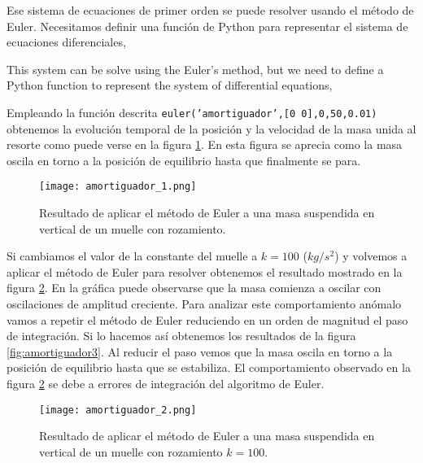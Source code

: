 \begin{paracol}{2}
Ese sistema de ecuaciones de primer orden se puede resolver usando el método de Euler. Necesitamos definir una función de Python para representar el sistema de ecuaciones diferenciales,

\switchcolumn
This system can be solve using the Euler's method, but we need to define a Python function to represent the system of differential equations,
\end{paracol}


\begin{paracol}{2}
Empleando la función descrita \texttt{euler('amortiguador',[0 0],0,50,0.01)} obtenemos la evolución temporal de la posición y la velocidad de la masa unida al resorte como puede verse en la figura \ref{fig:amortiguador1}. En esta figura se aprecia como la masa oscila en torno a la posición de equilibrio hasta que finalmente se para.
\end{paracol}
\begin{figure}[h]
	\centering
	\texttt{[image: amortiguador\_1.png]}
	\caption{Resultado de aplicar el método de Euler a una masa suspendida en vertical de un muelle con rozamiento.}
	\label{fig:amortiguador1}
\end{figure}
\begin{paracol}{2}
Si cambiamos el valor de la constante del muelle a $k=100$ ($kg/s^2$) y volvemos a aplicar el método de Euler para resolver obtenemos el resultado mostrado en la figura \ref{fig:amortiguador2}. En la gráfica puede observarse que la masa comienza a oscilar con oscilaciones de amplitud creciente. Para analizar este comportamiento anómalo vamos a repetir el método de Euler reduciendo en un orden de magnitud el paso de integración. Si lo hacemos así obtenemos los resultados de la figura \ref{fig:amortiguador3}. Al reducir el paso vemos que la masa oscila en torno a la posición de equilibrio hasta que se estabiliza. El comportamiento observado en la figura \ref{fig:amortiguador2} se debe a errores de integración del algoritmo de Euler.
\end{paracol}
\begin{figure}[h]
	\centering
	\texttt{[image: amortiguador\_2.png]}
	\caption{Resultado de aplicar el método de Euler a una masa suspendida en vertical de un muelle con rozamiento $k=100$.}
	\label{fig:amortiguador2}
\end{figure}

